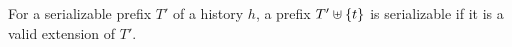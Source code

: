 \begin{lemma}
 \label{serpref:1}
 For a serializable prefix $T'$ of a history $h$, a prefix $T'\uplus\{{t}\}$ is serializable if it is a valid extension of $T'$.
\end{lemma}
  
% 
% 
% 
% 
% 
% 

